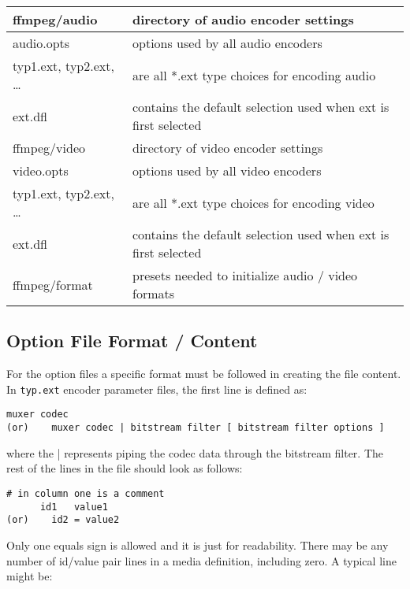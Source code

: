 \begin{center}
    \begin{longtable}{l p{23em}}
        \toprule
        ffmpeg/audio & directory of audio encoder settings \\
        \midrule
        audio.opts & options used by all audio encoders \\
        typ1.ext, typ2.ext, … & are all *.ext type choices for encoding audio \\
        ext.dfl & contains the default selection used when ext is first selected \\
        \midrule
        ffmpeg/video & directory of video encoder settings \\
        \midrule
        video.opts & options used by all video encoders \\
        typ1.ext, typ2.ext, … & are all *.ext type choices for encoding video \\
        ext.dfl & contains the default selection used when ext is first selected \\
        \midrule
        ffmpeg/format & presets needed to initialize audio / video formats \\
        \bottomrule
    \end{longtable}
\end{center}

\subsection{Option File Format / Content}%
\label{sub:option_file_format_content}

For the option files a specific format must be followed in creating the file content.
In \texttt{typ.ext} encoder parameter files, the first line is defined as:

\begin{lstlisting}[style=sh]
      muxer codec
(or) 	muxer codec | bitstream filter [ bitstream filter options ]
\end{lstlisting}

where the | represents piping the codec data through the bitstream filter. The rest of the lines in the file should look as follows:

\begin{lstlisting}[style=sh]
      # in column one is a comment
      id1   value1
(or)	id2 = value2
\end{lstlisting}

Only one equals sign is allowed and it is just for readability.  There may be any number of id/value pair lines in a media definition, including zero. A typical line might be:


